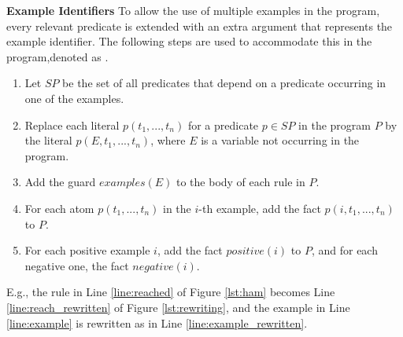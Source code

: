 \vspace{3pt}
\textbf{Example Identifiers} 
To allow the use of multiple examples in the program, every relevant predicate is extended with
an extra argument that represents the example identifier.  The following steps are used
to accommodate this in the program,denoted as \metae.
\begin{enumerate}
\item
  Let $\textit{SP}$ be the set of all predicates that depend on a predicate occurring in one of the examples. 
\item
  Replace each literal $p(t_1, ...,t_n)$ for a predicate $p \in \textit{SP}$ in the program $P$ by 
the literal $p(E,t_1, ...,t_n)$, where $E$ is a variable not occurring in the program. 
\item
  Add the guard $\textit{examples}(E)$ to the body of each rule in $P$.\
\item
For each atom $p(t_1,...,t_n)$ in the $i$-th example, add the fact $p(i,t_1,...,t_n)$ to $P$.
\item
  For each positive example $i$, add the fact $\textit{positive}(i)$ to $P$, and for each negative one, the fact $\textit{negative}(i)$.
\end{enumerate}
E.g., the rule in Line \ref{line:reached} of Figure \ref{lst:ham} becomes Line \ref{line:reach_rewritten} of Figure \ref{lst:rewriting}, and the example in Line \ref{line:example} is rewritten as in Line \ref{line:example_rewritten}.



